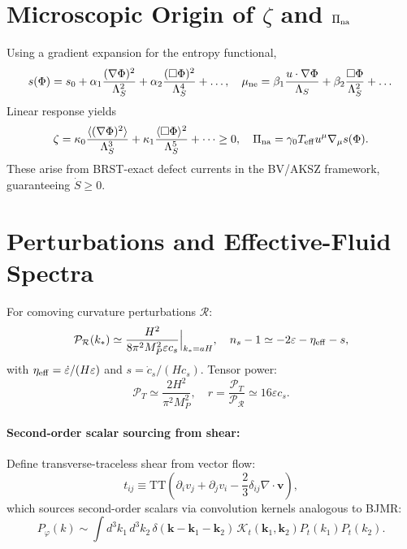 \documentclass[12pt, a4paper, openany]{book}
\theoremstyle{definition}
\begin{document}
\section{Microscopic Origin of $\zeta$ and $\Pi_{\rm na}$}
Using a gradient expansion for the entropy functional,
\begin{equation}
    s(\Phi) = s_0 + \alpha_1 \frac{(\nabla\Phi)^2}{\Lambda_S^2} + \alpha_2 \frac{(\Box \Phi)^2}{\Lambda_S^4} + \dots, \quad \mu_{\rm ne} = \beta_1 \frac{u \cdot \nabla \Phi}{\Lambda_S} + \beta_2 \frac{\Box \Phi}{\Lambda_S^2} + \dots
\end{equation}
Linear response yields
\begin{equation}
    \zeta = \kappa_0 \frac{\langle (\nabla\Phi)^2\rangle}{\Lambda_S^3} + \kappa_1 \frac{\langle \Box \Phi\rangle^2}{\Lambda_S^5} + \dots \ge 0, \quad \Pi_{\rm na} = \gamma_0 T_{\rm eff} u^\mu \nabla_\mu s(\Phi).
\end{equation}
These arise from BRST-exact defect currents in the BV/AKSZ framework, guaranteeing $\dot S \ge 0$.

\section{Perturbations and Effective-Fluid Spectra}
For comoving curvature perturbations $\mathcal R$:
\begin{equation}
    \mathcal P_{\mathcal R}(k_*) \simeq \frac{H^2}{8 \pi^2 M_P^2 \varepsilon c_s}\Big|_{k_*=aH}, \quad n_s-1 \simeq -2 \varepsilon - \eta_{\rm eff} - s,
\end{equation}
with $\eta_{\rm eff} = \dot \varepsilon / (H \varepsilon)$ and $s = \dot c_s / (H c_s)$. Tensor power:
\begin{equation}
    \mathcal P_T \simeq \frac{2 H^2}{\pi^2 M_P^2}, \quad r = \frac{\mathcal P_T}{\mathcal P_{\mathcal R}} \simeq 16 \varepsilon c_s.
\end{equation}

\paragraph{Second-order scalar sourcing from shear:}
Define transverse-traceless shear from vector flow:
\begin{equation}
    t_{ij} \equiv \mathrm{TT}\left(\partial_i v_j + \partial_j v_i - \frac{2}{3} \delta_{ij} \nabla \cdot \mathbf v \right),
\end{equation}
which sources second-order scalars via convolution kernels analogous to BJMR:
\begin{equation}
    P_\varphi(k) \sim \int d^3 k_1\, d^3 k_2\, \delta(\mathbf k - \mathbf k_1 - \mathbf k_2) \, \mathcal K_t(\mathbf k_1,\mathbf k_2) P_t(k_1) P_t(k_2).
\end{equation}
\end{document}
